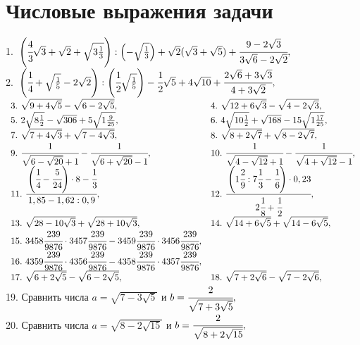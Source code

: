 \section{Числовые выражения задачи}
1.\ $\left(\cfrac{4}{3}\sqrt{3}+\sqrt{2}+\sqrt{3\frac{1}{3}}\right): \left(-\sqrt{\frac{1}{3}}\right)+\sqrt{2}(\sqrt{3}+\sqrt{5})+\cfrac{9-2\sqrt{3}}{3\sqrt{6}-2\sqrt{2}},$\\
2.\ $\left(\cfrac{1}{4}+\sqrt{\frac{1}{5}}-2\sqrt{2}\right): \left(\cfrac{1}{2}\sqrt{\frac{1}{5}}\right)-\cfrac{1}{2}\sqrt{5}+4\sqrt{10}+\cfrac{2\sqrt{6}+3\sqrt{3}}{4+3\sqrt{2}},$\\
$\begin{array}{ll}
3.\ \sqrt{9+4\sqrt{5}}-\sqrt{6-2\sqrt{5}},&
4.\ \sqrt{12+6\sqrt{3}}-\sqrt{4-2\sqrt{3}},\\
5.\ 2\sqrt{8\frac{1}{2}}-\sqrt{306}+5\sqrt{1\frac{9}{25}},&
6.\ 4\sqrt{10\frac{1}{2}}+\sqrt{168}-15\sqrt{1\frac{17}{25}},\\
7.\ \sqrt{7+4\sqrt{3}}+\sqrt{7-4\sqrt{3}},&
8.\ \sqrt{8+2\sqrt{7}}+\sqrt{8-2\sqrt{7}},\\
9.\ \cfrac{1}{\sqrt{6-\sqrt{20}}+1}-\cfrac{1}{\sqrt{6+\sqrt{20}}-1},&
10.\ \cfrac{1}{\sqrt{4-\sqrt{12}}+1}-\cfrac{1}{\sqrt{4+\sqrt{12}}-1},\\
11.\ \cfrac{\left(\cfrac{1}{4}-\cfrac{5}{24}\right)\cdot 8-\cfrac{1}{3}}{1,85-1,62:0,9},&
12.\ \cfrac{\left(1\cfrac{2}{9}:7\cfrac{1}{3}-\cfrac{1}{6}\right)\cdot0,23}{2\cfrac{1}{8}+\cfrac{1}{2}},\\
13.\ \sqrt{28-10\sqrt{3}}+\sqrt{28+10\sqrt{3}},&
14.\ \sqrt{14+6\sqrt{5}}+\sqrt{14-6\sqrt{5}},\\
15.\ 3458\cfrac{239}{9876}\cdot3457\cfrac{239}{9876}-3459\cfrac{239}{9876}\cdot3456\cfrac{239}{9876},\\
16.\ 4359\cfrac{239}{9876}\cdot4356\cfrac{239}{9876}-4358\cfrac{239}{9876}\cdot4357\cfrac{239}{9876},\\
17.\ \sqrt{6+2\sqrt{5}}-\sqrt{6-2\sqrt{5}},&
18.\ \sqrt{7+2\sqrt{6}}-\sqrt{7-2\sqrt{6}},\\
\end{array}$\\
19. Сравнить числа $a=\sqrt{7-3\sqrt{5}}$ и $b=\cfrac{2}{\sqrt{7+3\sqrt{5}}},$\\
20. Сравнить числа $a=\sqrt{8-2\sqrt{15}}$ и $b=\cfrac{2}{\sqrt{8+2\sqrt{15}}},$\\
